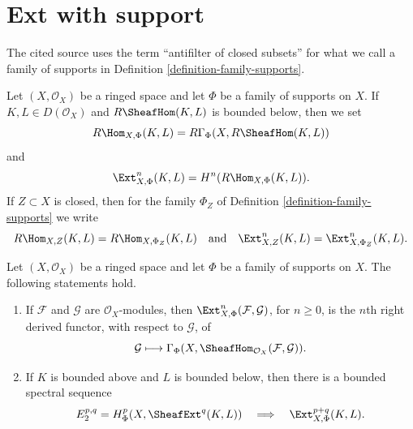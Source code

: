 \section{Ext with support}
\label{section-ext-support}

\begin{definition}
\label{definition-ext-with-support}
\begin{reference}
\cite[Chapter IV, \S 4.2, Remark 1, p. 190]{Tohoku}
\end{reference}
\begin{history}
The cited source uses the term ``antifilter of closed subsets'' for what
we call a family of supports in Definition
\ref{definition-family-supports}.
\end{history}
Let $(X, \mathcal{O}_X)$ be a ringed space and let $\Phi$ be a family of
supports on $X$. If $K, L \in D(\mathcal{O}_X)$ and
$R\SheafHom(K, L)$ is bounded below, then we set
$$
R\Hom_{X, \Phi}(K, L) =
R\Gamma_\Phi(X, R\SheafHom(K, L))
$$
and
$$
\Ext^n_{X, \Phi}(K, L) = H^n(R\Hom_{X, \Phi}(K, L)).
$$
If $Z \subset X$ is closed, then for the family $\Phi_Z$ of Definition
\ref{definition-family-supports} we write
$$
R\Hom_{X, Z}(K, L) = R\Hom_{X, \Phi_Z}(K, L)
\quad\text{and}\quad
\Ext^n_{X, Z}(K, L) = \Ext^n_{X, \Phi_Z}(K, L).
$$
\end{definition}

\begin{lemma}
\label{lemma-ext-with-support}
\begin{reference}
\cite[Chapter IV, Theorem 4.2.1, p. 188, and \S 4.2, Remark 1,
p. 190]{Tohoku}
\end{reference}
Let $(X, \mathcal{O}_X)$ be a ringed space and let $\Phi$ be a family of
supports on $X$. The following statements hold.
\begin{enumerate}
\item If $\mathcal{F}$ and $\mathcal{G}$ are $\mathcal{O}_X$-modules,
then $\Ext^n_{X, \Phi}(\mathcal{F}, \mathcal{G})$, for $n \geq 0$, is the
$n$th right derived functor, with respect to $\mathcal{G}$, of
$$
\mathcal{G} \longmapsto
\Gamma_\Phi(X, \SheafHom_{\mathcal{O}_X}(\mathcal{F}, \mathcal{G})).
$$
\item If $K$ is bounded above and $L$ is bounded below, then there is a
bounded spectral sequence
$$
E_2^{p, q} =
H_\Phi^p(X, \SheafExt^q(K, L))
\quad\Longrightarrow\quad
\Ext^{p + q}_{X, \Phi}(K, L).
$$
\end{enumerate}
\end{lemma}

